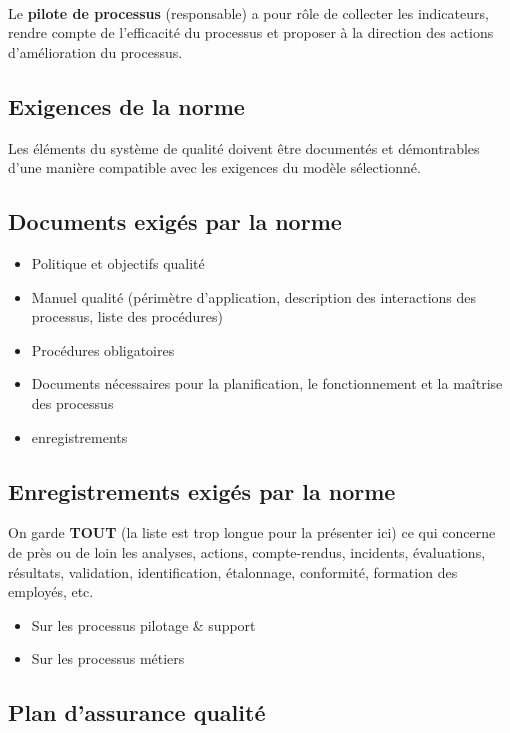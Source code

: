 \hfill\\

Le \textbf{pilote de processus} (responsable) a pour rôle de collecter les indicateurs, rendre compte de l’efficacité du processus et proposer à la direction des actions d’amélioration du processus.


\subsection{Exigences de la norme}

Les éléments du système de qualité doivent être documentés et démontrables d’une manière compatible avec les exigences du modèle sélectionné.

\subsection{Documents exigés par la norme}
\begin{itemize}
	\item Politique et objectifs qualité
	\item Manuel qualité (périmètre d'application, description des interactions des processus, liste des procédures)
	\item Procédures obligatoires
	\item Documents nécessaires pour la planification, le fonctionnement et la maîtrise des processus
	\item enregistrements
\end{itemize}

\subsection{Enregistrements exigés par la norme}
On garde \textbf{TOUT} (la liste est trop longue pour la présenter ici) ce qui concerne de près ou de loin les analyses, actions, compte-rendus, incidents, évaluations, résultats, validation, identification, étalonnage, conformité, formation des employés, etc.

\begin{itemize}
	\item Sur les processus pilotage & support
	\item Sur les processus métiers
\end{itemize}

\subsection{Plan d’assurance qualité}

